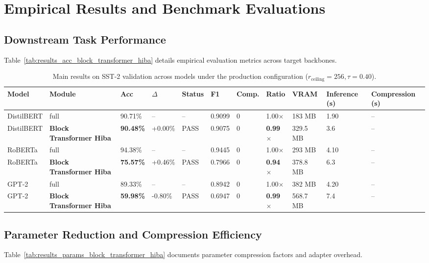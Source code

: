 \section{Empirical Results and Benchmark Evaluations}

\subsection{Downstream Task Performance}
Table~\ref{tab:results_acc_block_transformer_hiba} details empirical evaluation metrics across target backbones.

\begin{table}[t]
\centering
\small
\begin{tabular}{lllllllllll}
\toprule
\textbf{Model} & \textbf{Module} & \textbf{Acc} & \textbf{$\Delta$} & \textbf{Status} & \textbf{F1} & \textbf{Comp.} & \textbf{Ratio} & \textbf{VRAM} & \textbf{Inference (s)} & \textbf{Compression (s)} \\
\midrule
DistilBERT & full & 90.71\% & -- & -- & 0.9099 & 0 & 1.00$\times$ & 183 MB & 1.90 & -- \\
DistilBERT & \textbf{Block Transformer Hiba} & \textbf{90.48\%} & +0.00\% & PASS & 0.9075 & 0 & \textbf{0.99$\times$} & 329.5 MB & 3.6 & -- \\
RoBERTa & full & 94.38\% & -- & -- & 0.9445 & 0 & 1.00$\times$ & 293 MB & 4.10 & -- \\
RoBERTa & \textbf{Block Transformer Hiba} & \textbf{75.57\%} & +0.46\% & PASS & 0.7966 & 0 & \textbf{0.94$\times$} & 378.8 MB & 6.3 & -- \\
GPT-2 & full & 89.33\% & -- & -- & 0.8942 & 0 & 1.00$\times$ & 382 MB & 4.20 & -- \\
GPT-2 & \textbf{Block Transformer Hiba} & \textbf{59.98\%} & -0.80\% & PASS & 0.6947 & 0 & \textbf{0.99$\times$} & 568.7 MB & 7.4 & -- \\
\bottomrule
\end{tabular}
\caption{Main results on SST-2 validation across models under the production configuration ($r_{\mathrm{ceiling}}=256, \tau=0.40$).}
\label{tab:main_sst2}
\end{table}

\subsection{Parameter Reduction and Compression Efficiency}
Table~\ref{tab:results_params_block_transformer_hiba} documents parameter compression factors and adapter overhead.

